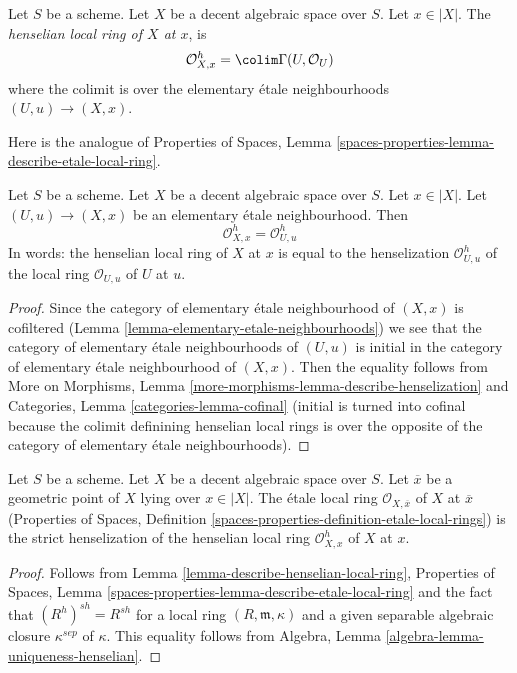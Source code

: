 \begin{definition}
\label{definition-henselian-local-ring}
Let $S$ be a scheme. Let $X$ be a decent algebraic space over $S$.
Let $x \in |X|$. The {\it henselian local ring of $X$ at $x$}, is
$$
\mathcal{O}_{X, x}^h = \colim \Gamma(U, \mathcal{O}_U)
$$
where the colimit is over the elementary \'etale neighbourhoods
$(U, u) \to (X, x)$.
\end{definition}

\noindent
Here is the analogue of
Properties of Spaces, Lemma
\ref{spaces-properties-lemma-describe-etale-local-ring}.

\begin{lemma}
\label{lemma-describe-henselian-local-ring}
Let $S$ be a scheme. Let $X$ be a decent algebraic space over $S$.
Let $x \in |X|$. Let $(U, u) \to (X, x)$ be an elementary
\'etale neighbourhood. Then
$$
\mathcal{O}_{X, x}^h = \mathcal{O}_{U, u}^h
$$
In words: the henselian local ring of $X$ at $x$
is equal to the henselization $\mathcal{O}_{U, u}^h$
of the local ring $\mathcal{O}_{U, u}$ of $U$ at $u$.
\end{lemma}

\begin{proof}
Since the category of elementary \'etale neighbourhood of $(X, x)$
is cofiltered (Lemma \ref{lemma-elementary-etale-neighbourhoods})
we see that
the category of elementary \'etale neighbourhoods of $(U, u)$
is initial in
the category of elementary \'etale neighbourhood of $(X, x)$.
Then the equality follows from
More on Morphisms, Lemma \ref{more-morphisms-lemma-describe-henselization}
and
Categories, Lemma \ref{categories-lemma-cofinal}
(initial is turned into cofinal because the colimit
definining henselian local rings is over the
opposite of the category of elementary
\'etale neighbourhoods).
\end{proof}

\begin{lemma}
\label{lemma-henselian-local-ring-strict}
Let $S$ be a scheme. Let $X$ be a decent algebraic space over $S$.
Let $\overline{x}$ be a geometric point of $X$ lying over $x \in |X|$. 
The \'etale local ring $\mathcal{O}_{X, \overline{x}}$ of $X$ at $\overline{x}$
(Properties of Spaces, Definition
\ref{spaces-properties-definition-etale-local-rings})
is the strict henselization
of the henselian local ring $\mathcal{O}_{X, x}^h$ of $X$ at $x$.
\end{lemma}

\begin{proof}
Follows from Lemma \ref{lemma-describe-henselian-local-ring},
Properties of Spaces, Lemma
\ref{spaces-properties-lemma-describe-etale-local-ring}
and the fact that $(R^h)^{sh} = R^{sh}$
for a local ring $(R, \mathfrak m, \kappa)$ and a given
separable algebraic closure $\kappa^{sep}$ of $\kappa$.
This equality follows from
Algebra, Lemma \ref{algebra-lemma-uniqueness-henselian}.
\end{proof}

